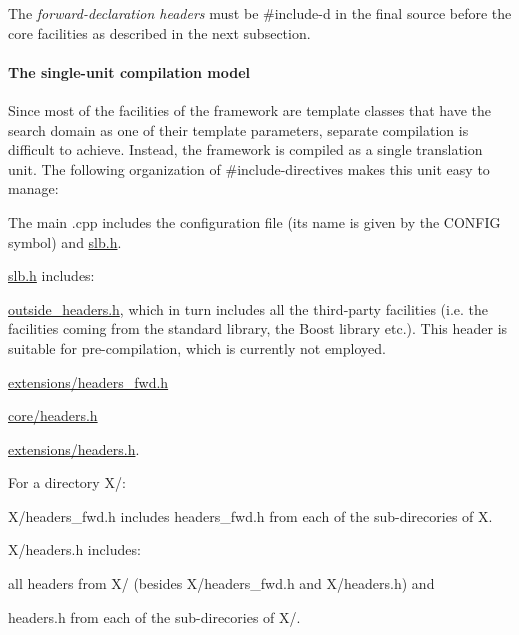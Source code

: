 The {\itshape forward-\/declaration headers} must be {\ttfamily \#include}-\/d in the final source before the core facilities as described in the next subsection.\hypertarget{index_s-single-unit}{}\paragraph{The single-\/unit compilation model}\label{index_s-single-unit}
Since most of the facilities of the framework are template classes that have the search domain as one of their template parameters, separate compilation is difficult to achieve. Instead, the framework is compiled as a single translation unit. The following organization of {\ttfamily \#include}-\/directives makes this unit easy to manage\+:
\begin{DoxyItemize}
\item The main {\ttfamily .cpp} includes the configuration file (its name is given by the {\ttfamily C\+O\+N\+F\+IG} symbol) and {\ttfamily \hyperlink{slb_8h}{slb.\+h}}.
\item {\ttfamily \hyperlink{slb_8h}{slb.\+h}} includes\+:
\begin{DoxyItemize}
\item {\ttfamily \hyperlink{outside__headers_8h}{outside\+\_\+headers.\+h}}, which in turn includes all the third-\/party facilities (i.\+e. the facilities coming from the standard library, the {\ttfamily Boost} library etc.). This header is suitable for pre-\/compilation, which is currently not employed.
\item {\ttfamily \hyperlink{headers__fwd_8h}{extensions/headers\+\_\+fwd.\+h}}
\item {\ttfamily \hyperlink{core_2headers_8h}{core/headers.\+h}}
\item {\ttfamily \hyperlink{extensions_2headers_8h}{extensions/headers.\+h}}.
\end{DoxyItemize}
\item For a directory {\ttfamily X/}\+:
\begin{DoxyItemize}
\item {\ttfamily X/headers\+\_\+fwd.\+h} includes {\ttfamily headers\+\_\+fwd.\+h} from each of the sub-\/direcories of {\ttfamily X}.
\item {\ttfamily X/headers.\+h} includes\+:
\begin{DoxyItemize}
\item all headers from {\ttfamily X/} (besides {\ttfamily X/headers\+\_\+fwd.\+h} and {\ttfamily X/headers.\+h}) and
\item {\ttfamily headers.\+h} from each of the sub-\/direcories of {\ttfamily X/}.
\end{DoxyItemize}
\end{DoxyItemize}
\end{DoxyItemize}


